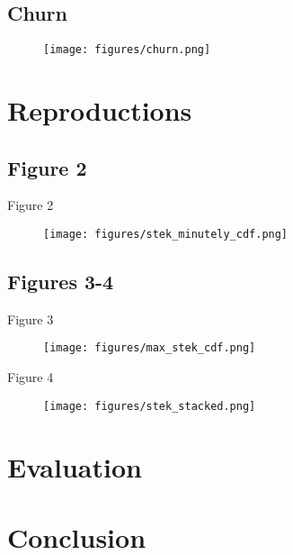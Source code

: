 \subsection{Churn}


\begin{figure}[tp]
\centering
\texttt{[image: figures/churn.png]}
\caption{\blindtext}
\end{figure}


\section{Reproductions}

\subsection{Figure 2}

Figure 2
\begin{figure}[tp]
\centering
\texttt{[image: figures/stek\_minutely\_cdf.png]}
\caption{\blindtext}
\end{figure}

\subsection{Figures 3-4}
Figure 3
\begin{figure}[tp]
\centering
\texttt{[image: figures/max\_stek\_cdf.png]}
\caption{\blindtext}
\end{figure}

Figure 4
\begin{figure}[tp]
\centering
\texttt{[image: figures/stek\_stacked.png]}
\caption{\blindtext}
\end{figure}

\section{Evaluation}

\section{Conclusion}